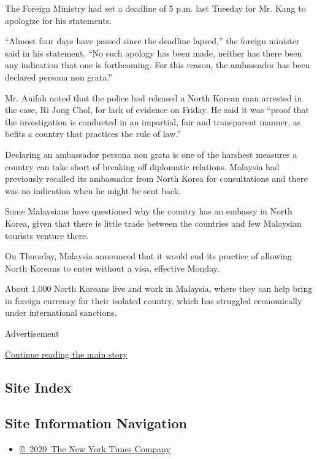 The Foreign Ministry had set a deadline of 5 p.m. last Tuesday for Mr.
Kang to apologize for his statements.

``Almost four days have passed since the deadline lapsed,'' the foreign
minister said in his statement. ``No such apology has been made, neither
has there been any indication that one is forthcoming. For this reason,
the ambassador has been declared persona non grata.''

Mr. Anifah noted that the police had released a North Korean man
arrested in the case, Ri Jong Chol, for lack of evidence on Friday. He
said it was ``proof that the investigation is conducted in an impartial,
fair and transparent manner, as befits a country that practices the rule
of law.''

Declaring an ambassador persona non grata is one of the harshest
measures a country can take short of breaking off diplomatic relations.
Malaysia had previously recalled its ambassador from North Korea for
consultations and there was no indication when he might be sent back.

Some Malaysians have questioned why the country has an embassy in North
Korea, given that there is little trade between the countries and few
Malaysian tourists venture there.

On Thursday, Malaysia announced that it would end its practice of
allowing North Koreans to enter without a visa, effective Monday.

About 1,000 North Koreans live and work in Malaysia, where they can help
bring in foreign currency for their isolated country, which has
struggled economically under international sanctions.

Advertisement

\protect\hyperlink{after-bottom}{Continue reading the main story}

\hypertarget{site-index}{%
\subsection{Site Index}\label{site-index}}

\hypertarget{site-information-navigation}{%
\subsection{Site Information
Navigation}\label{site-information-navigation}}

\begin{itemize}
\tightlist
\item
  \href{https://help.nytimes3xbfgragh.onion/hc/en-us/articles/115014792127-Copyright-notice}{©~2020~The
  New York Times Company}
\end{itemize}

